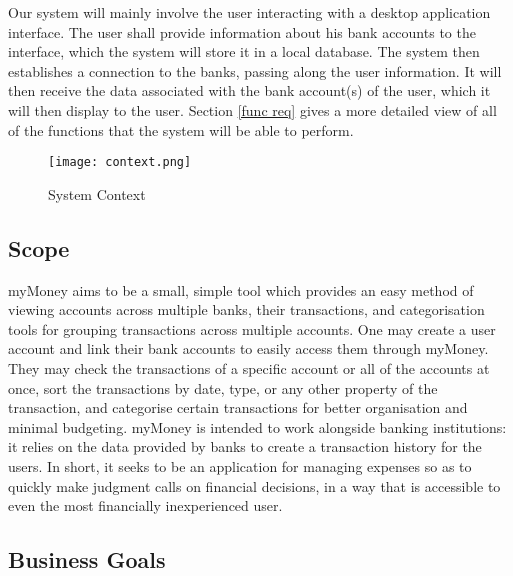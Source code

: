 \documentclass[11pt]{article}
\newcounter{use case ID}
\newcounter{req ID}
\begin{document}
Our system will mainly involve the user interacting with a desktop application interface. The user shall provide information about his bank accounts to the interface, which the system will store it in a local database. The system then establishes a connection to the banks, passing along the user information. It will then receive the data associated with the bank account(s) of the user, which it will then display to the user. Section \ref{func req} gives a more detailed view of all of the functions that the system will be able to perform.

\begin{figure}[htbp]
\texttt{[image: context.png]}
\caption{System Context}
\label{fig:system-context}
\end{figure}

\subsection{Scope}
myMoney aims to be a small, simple tool which provides an easy method of viewing accounts across multiple banks, their transactions, and categorisation tools for grouping transactions across multiple accounts. One may create a user account and link their bank accounts to easily access them through myMoney. They may check the transactions of a specific account or all of the accounts at once, sort the transactions by date, type, or any other property of the transaction, and categorise certain transactions for better organisation and minimal budgeting. myMoney is intended to work alongside banking institutions: it relies on the data provided by banks to create a transaction history for the users. In short, it seeks to be an application for managing expenses so as to quickly make judgment calls on financial decisions, in a way that is accessible to even the most financially inexperienced user.

\subsection{Business Goals}
\end{document}
